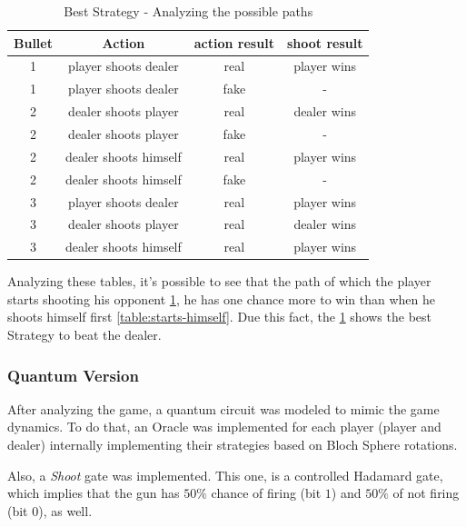 \documentclass{article}
\begin{document}
\begin{table}[h]
	\begin{center}
		\begin{tabular}{ |c|c|c|c| } 
			\hline
			Bullet & Action & action result & shoot result \\
			\hline
			1 & player shoots dealer  & real & player wins\\
			\hline
			1 & player shoots dealer  & fake & -\\
			\hline
			2 & dealer shoots player  & real & dealer wins\\
			\hline
			2 & dealer shoots player  & fake & -\\
			\hline
			2 & dealer shoots himself  & real & player wins\\
			\hline
			2 & dealer shoots himself  & fake & -\\
			\hline
			3 & player shoots dealer  & real & player wins\\
			\hline
			3 & dealer shoots player & real & dealer wins\\
			\hline
			3 & dealer shoots himself & real & player wins\\
			\hline
		\end{tabular}
		\caption{Best Strategy - Analyzing the possible paths}
		\label{table:starts-shooting}
	\end{center}
\end{table}

Analyzing these tables, it's possible to see that the path of which the player starts shooting his opponent \ref{table:starts-shooting}, he has one chance more to win than when he shoots himself first \ref{table:starts-himself}. Due this fact, the \ref{table:starts-shooting} shows the best Strategy to beat the dealer.

\subsubsection{Quantum Version}

After analyzing the game, a quantum circuit was modeled to mimic the game dynamics. To do that, an Oracle was implemented for each player (player and dealer) internally implementing their strategies based on Bloch Sphere rotations.

Also, a \emph{Shoot} gate was implemented. This one, is a controlled Hadamard gate, which implies that the gun has $50\%$ chance of firing (bit $1$) and $50\%$ of not firing (bit $0$), as well.

\newpage
\end{document}
